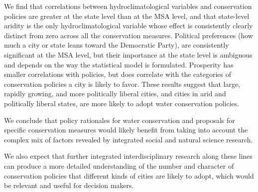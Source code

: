 \documentclass[draft,linenumbers]{agujournal}\usepackage{knitr}
\begin{document}
We find that correlations between
hydroclimatological variables
and conservation policies are greater at the state level than at
the MSA level, and that state-level aridity is the only hydroclimatological
variable whose effect is consistently clearly distinct
from zero across all the conservation measures.
Political preferences (how much a city or state leans toward the Democratic
Party), are consistently significant at the MSA level, but their importance at the state
level is ambiguous and depends on the way the statistical model is formulated.
Prosperity has smaller correlations with policies, but
does correlate with the
categories of conservation policies a city is likely to favor.
These results suggest that large, rapidly growing, and more politically liberal
cities, and cities in arid and politically liberal states,
are
more likely to
adopt water conservation policies.

We conclude that policy
rationales for water conservation and proposals for specific conservation measures
would likely benefit from taking into account the complex mix of factors revealed
by integrated social and natural science research.

We also expect that further integrated interdisciplinary research along
these lines can produce a more detailed understanding of the number and character
of conservation policies that different kinds of cities are likely to adopt,
which would be relevant and useful for decision makers.
\end{document}

